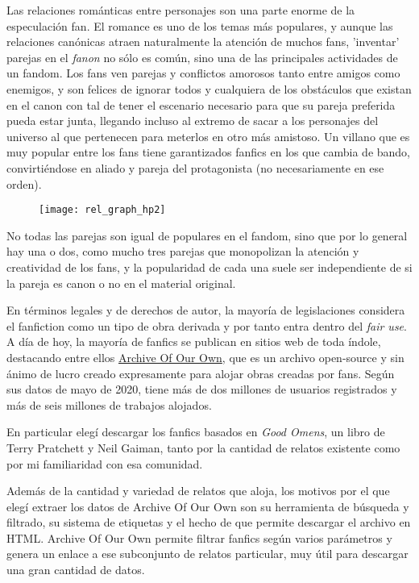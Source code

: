 \documentclass{pre-tfg}
\begin{document}
Las relaciones románticas entre personajes son una parte enorme de la especulación fan. El romance es uno de los temas más populares, y aunque las relaciones canónicas atraen naturalmente la atención de muchos fans, 'inventar' parejas en el \textit{fanon} no sólo es común, sino una de las principales actividades de un fandom. Los fans ven parejas y conflictos amorosos tanto entre amigos como enemigos,  y son felices de ignorar todos y cualquiera de los obstáculos que existan en el canon con tal de tener el escenario necesario para que su pareja preferida pueda estar junta, llegando incluso al extremo de sacar a los personajes del universo al que pertenecen para meterlos en otro más amistoso. Un villano que es muy popular entre los fans tiene garantizados fanfics en los que cambia de bando, convirtiéndose en aliado y pareja del protagonista (no necesariamente en ese orden).

\begin{figure}
	\texttt{[image: rel\_graph\_hp2]}
	\label{fig:graph_hp}
	\centering
\end{figure}

No todas las parejas son igual de populares en el fandom, sino que por lo general hay una o dos, como mucho tres parejas que monopolizan la atención y creatividad de los fans, y la popularidad de cada una suele ser independiente de si la pareja es canon o no en el material original.

En términos legales y de derechos de autor, la mayoría de legislaciones considera el fanfiction como un tipo de obra derivada \cite{woosh_1998} y por tanto entra dentro del \textit{fair use}. A día de hoy, la mayoría de fanfics se publican en sitios web de toda índole, destacando entre ellos \href{archiveofourown.org}{Archive Of Our Own}, que es un archivo open-source y sin ánimo de lucro creado expresamente para alojar obras creadas por fans. Según sus datos de mayo de 2020, tiene más de dos millones de usuarios registrados y más de seis millones de trabajos alojados. 


En particular elegí descargar los fanfics basados en \textit{Good Omens}, un libro de Terry Pratchett y Neil Gaiman, tanto por la cantidad de relatos existente como por mi familiaridad con esa comunidad.

Además de la cantidad y variedad de relatos que aloja, los motivos por el que elegí extraer los datos de  Archive Of Our Own son su herramienta de búsqueda y filtrado, su sistema de etiquetas y el hecho de que permite descargar el archivo en HTML. Archive Of Our Own permite filtrar fanfics según varios parámetros y genera un enlace a ese subconjunto de relatos particular, muy útil para descargar una gran cantidad de datos.
\end{document}
